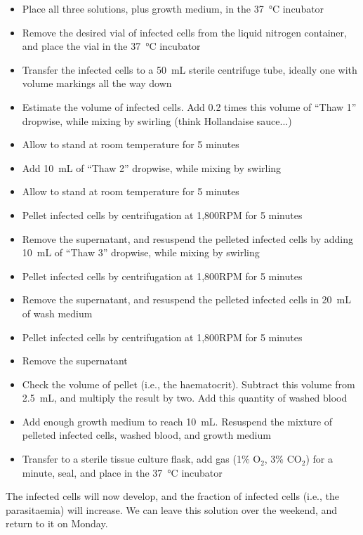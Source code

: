 \documentclass{article}
\begin{document}
\begin{itemize}
	\item Place all three solutions, plus growth medium, in the \SI{37}{\celsius} incubator
	\item Remove the desired vial of infected cells from the liquid nitrogen container, and place the vial in the \SI{37}{\celsius} incubator
	\item Transfer the infected cells to a \SI{50}{mL} sterile centrifuge tube, ideally one with volume markings all the way down
	\item Estimate the volume of infected cells. Add 0.2 times this volume of ``Thaw 1'' dropwise, while mixing by swirling (think Hollandaise sauce...)
	\item Allow to stand at room temperature for 5 minutes
	\item Add \SI{10}{mL} of ``Thaw 2'' dropwise, while mixing by swirling
	\item Allow to stand at room temperature for 5 minutes
	\item Pellet infected cells by centrifugation at 1,800RPM for 5 minutes
	\item Remove the supernatant, and resuspend the pelleted infected cells by adding \SI{10}{mL} of ``Thaw 3'' dropwise, while mixing by swirling
	\item Pellet infected cells by centrifugation at 1,800RPM for 5 minutes
	\item Remove the supernatant, and resuspend the pelleted infected cells in \SI{20}{mL} of wash medium
	\item Pellet infected cells by centrifugation at 1,800RPM for 5 minutes
	\item Remove the supernatant
	\item Check the volume of pellet (i.e., the haematocrit). Subtract this volume from \SI{2.5}{mL}, and multiply the result by two. Add this quantity of washed blood
	\item Add enough growth medium to reach \SI{10}{mL}. Resuspend the mixture of pelleted infected cells, washed blood, and growth medium
	\item Transfer to a sterile tissue culture flask, add gas (1\% O$_2$, 3\% CO$_2$) for a minute, seal, and place in the \SI{37}{\celsius} incubator
\end{itemize}

The infected cells will now develop, and the fraction of infected cells (i.e., the parasitaemia) will increase. We can leave this solution over the weekend, and return to it on Monday.\\
\end{document}
